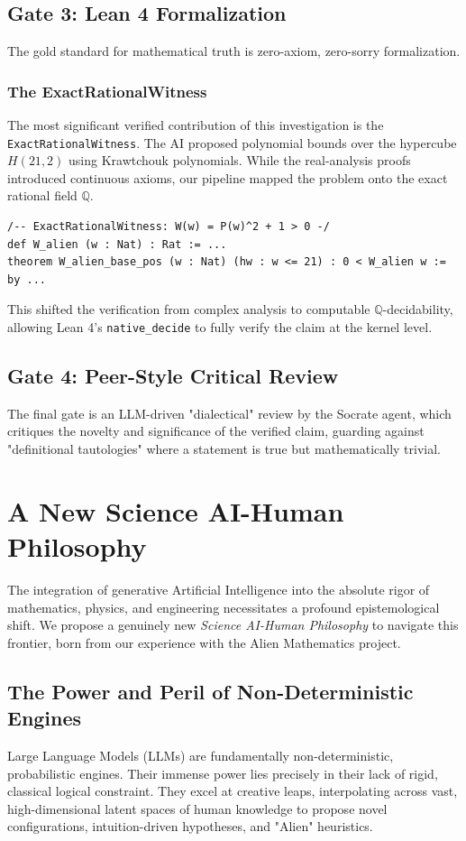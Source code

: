 \documentclass[11pt,a4paper]{article}
\begin{document}
\subsection{Gate 3: Lean 4 Formalization}
The gold standard for mathematical truth is zero-axiom, zero-sorry formalization. 

\subsubsection{The ExactRationalWitness}
The most significant verified contribution of this investigation is the \texttt{ExactRationalWitness}. The AI proposed polynomial bounds over the hypercube $H(21,2)$ using Krawtchouk polynomials. While the real-analysis proofs introduced continuous axioms, our pipeline mapped the problem onto the exact rational field $\mathbb{Q}$.

\begin{lstlisting}
/-- ExactRationalWitness: W(w) = P(w)^2 + 1 > 0 -/
def W_alien (w : Nat) : Rat := ...
theorem W_alien_base_pos (w : Nat) (hw : w <= 21) : 0 < W_alien w := by ...
\end{lstlisting}
This shifted the verification from complex analysis to computable $\mathbb{Q}$-decidability, allowing Lean 4's \texttt{native\_decide} to fully verify the claim at the kernel level.

\subsection{Gate 4: Peer-Style Critical Review}
The final gate is an LLM-driven "dialectical" review by the Socrate agent, which critiques the novelty and significance of the verified claim, guarding against "definitional tautologies" where a statement is true but mathematically trivial.

\section{A New Science AI-Human Philosophy}

The integration of generative Artificial Intelligence into the absolute rigor of mathematics, physics, and engineering necessitates a profound epistemological shift. We propose a genuinely new \textit{Science AI-Human Philosophy} to navigate this frontier, born from our experience with the Alien Mathematics project.

\subsection{The Power and Peril of Non-Deterministic Engines}
Large Language Models (LLMs) are fundamentally non-deterministic, probabilistic engines. Their immense power lies precisely in their lack of rigid, classical logical constraint. They excel at creative leaps, interpolating across vast, high-dimensional latent spaces of human knowledge to propose novel configurations, intuition-driven hypotheses, and "Alien" heuristics. 
\end{document}
